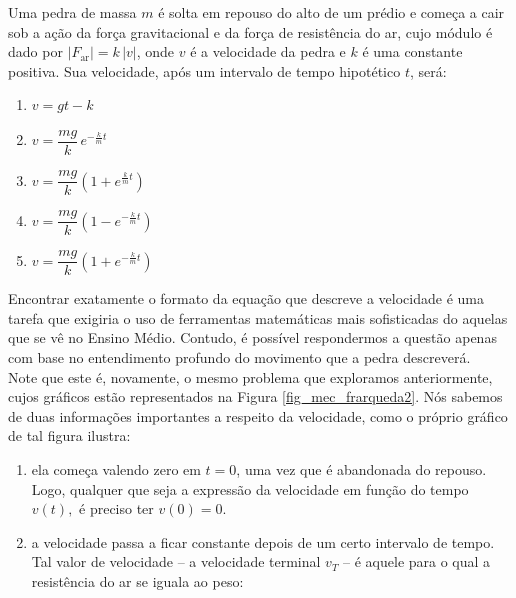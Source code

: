\begin{exemplo}\label{exemplo_newton_frarex03}

Uma pedra de massa $m$ é solta em repouso do alto de um prédio e começa a cair sob a ação da força gravitacional e da força de resistência do ar, cujo módulo é dado por $|F_{\text{ar}}| = k\,|v|$, onde $v$ é a velocidade da pedra e $k$ é uma constante positiva. Sua velocidade, após um intervalo de tempo hipotético $t$, será:

\begin{enumerate}

\item [a)] $v = gt - k$

\item [b)] $v = \dfrac{mg}{k}\, e^{-\frac{k}{m}t}$

\item [c)] $v = \dfrac{mg}{k}\left(1 + e^{\frac{k}{m}t}\right)$

\item [d)] $v = \dfrac{mg}{k}\left(1 - e^{-\frac{k}{m}t}\right)$

\item [e)] $v = \dfrac{mg}{k}\left(1 + e^{-\frac{k}{m}t}\right)$

\end{enumerate}


\resolucao

Encontrar exatamente o formato da equação que descreve a velocidade é uma tarefa que exigiria o uso de ferramentas matemáticas mais sofisticadas do aquelas que se vê no Ensino Médio. Contudo, é possível respondermos a questão apenas com base no entendimento profundo do movimento que a pedra descreverá. \\

Note que este é, novamente, o mesmo problema que exploramos anteriormente, cujos gráficos estão representados na Figura \ref{fig_mec_frarqueda2}. Nós sabemos de duas informações importantes a respeito da velocidade, como o próprio gráfico de tal figura ilustra:

\begin{enumerate}
    \item [(i)] ela começa valendo zero em $t=0$, uma vez que é abandonada do repouso. Logo, qualquer que seja a expressão da velocidade em função do tempo $v(t),$ é preciso ter $v(0)=0.$

    \item [(ii)] a velocidade passa a ficar constante depois de um certo intervalo de tempo. Tal valor de velocidade -- a velocidade terminal $v_T$ -- é aquele para o qual a resistência do ar se iguala ao peso:


\end{enumerate}
\end{exemplo}
